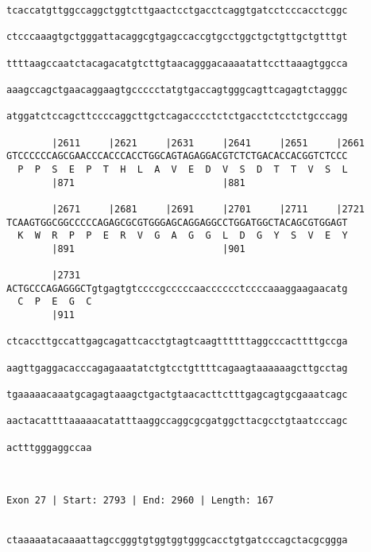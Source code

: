 \documentclass{article}
\begin{document}
\begin{Verbatim}
tcaccatgttggccaggctggtcttgaactcctgacctcaggtgatcctcccacctcggc
                                                            
ctcccaaagtgctgggattacaggcgtgagccaccgtgcctggctgctgttgctgtttgt
                                                            
ttttaagccaatctacagacatgtcttgtaacagggacaaaatattccttaaagtggcca
                                                            
aaagccagctgaacaggaagtgccccctatgtgaccagtgggcagttcagagtctagggc
                                                            
atggatctccagcttccccaggcttgctcagacccctctctgacctctcctctgcccagg
                                                            
        |2611     |2621     |2631     |2641     |2651     |2661
GTCCCCCCAGCGAACCCACCCACCTGGCAGTAGAGGACGTCTCTGACACCACGGTCTCCC
  P  P  S  E  P  T  H  L  A  V  E  D  V  S  D  T  T  V  S  L
        |871                          |881                  
  
        |2671     |2681     |2691     |2701     |2711     |2721
TCAAGTGGCGGCCCCCAGAGCGCGTGGGAGCAGGAGGCCTGGATGGCTACAGCGTGGAGT
  K  W  R  P  P  E  R  V  G  A  G  G  L  D  G  Y  S  V  E  Y
        |891                          |901                  
  
        |2731                                               
ACTGCCCAGAGGGCTgtgagtgtccccgcccccaacccccctccccaaaggaagaacatg
  C  P  E  G  C                                             
        |911                                                
  
ctcaccttgccattgagcagattcacctgtagtcaagttttttaggcccacttttgccga
                                                            
aagttgaggacacccagagaaatatctgtcctgttttcagaagtaaaaaagcttgcctag
                                                            
tgaaaaacaaatgcagagtaaagctgactgtaacacttctttgagcagtgcgaaatcagc
                                                            
aactacattttaaaaacatatttaaggccaggcgcgatggcttacgcctgtaatcccagc
                                                            
actttgggaggccaa
               
               
 
Exon 27 | Start: 2793 | End: 2960 | Length: 167


ctaaaaatacaaaattagccgggtgtggtggtgggcacctgtgatcccagctacgcggga
                                                            

\end{Verbatim}
\end{document}
